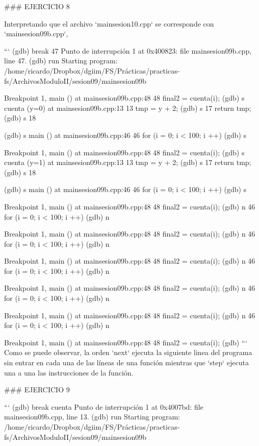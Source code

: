 {{{### EJERCICIO 8

Interpretando que el archivo `mainsesion10.cpp` se corresponde con `mainsesion09b.cpp`,

```
(gdb) break 47
Punto de interrupción 1 at 0x400823: file mainsesion09b.cpp, line 47.
(gdb) run
Starting program: /home/ricardo/Dropbox/dgiim/FS/Prácticas/practicas-fs/ArchivosModuloII/sesion09/mainsesion09b 

Breakpoint 1, main () at mainsesion09b.cpp:48
48	      final2 = cuenta(i);
(gdb) s
cuenta (y=0) at mainsesion09b.cpp:13
13	   tmp = y + 2; 
(gdb) s
17	   return tmp;
(gdb) s
18	}
(gdb) s
main () at mainsesion09b.cpp:46
46	   for (i = 0; i < 100; i ++)
(gdb) s

Breakpoint 1, main () at mainsesion09b.cpp:48
48	      final2 = cuenta(i);
(gdb) s
cuenta (y=1) at mainsesion09b.cpp:13
13	   tmp = y + 2; 
(gdb) s
17	   return tmp;
(gdb) s
18	}
(gdb) s
main () at mainsesion09b.cpp:46
46	   for (i = 0; i < 100; i ++)
(gdb) s

Breakpoint 1, main () at mainsesion09b.cpp:48
48	      final2 = cuenta(i);
(gdb) n
46	   for (i = 0; i < 100; i ++)
(gdb) n

Breakpoint 1, main () at mainsesion09b.cpp:48
48	      final2 = cuenta(i);
(gdb) n
46	   for (i = 0; i < 100; i ++)
(gdb) n

Breakpoint 1, main () at mainsesion09b.cpp:48
48	      final2 = cuenta(i);
(gdb) n
46	   for (i = 0; i < 100; i ++)
(gdb) n

Breakpoint 1, main () at mainsesion09b.cpp:48
48	      final2 = cuenta(i);
(gdb) n
46	   for (i = 0; i < 100; i ++)
(gdb) n

Breakpoint 1, main () at mainsesion09b.cpp:48
48	      final2 = cuenta(i);
(gdb) n
46	   for (i = 0; i < 100; i ++)
(gdb) n

Breakpoint 1, main () at mainsesion09b.cpp:48
48	      final2 = cuenta(i);
(gdb) 
```
Como se puede observar, la orden `next` ejecuta la siguiente linea del programa sin entrar en cada una de las líneas de una función mientras que `step` ejecuta una a una las instrucciones de la función.

### EJERCICIO 9

```
(gdb) break cuenta
Punto de interrupción 1 at 0x4007bd: file mainsesion09b.cpp, line 13.
(gdb) run
Starting program: /home/ricardo/Dropbox/dgiim/FS/Prácticas/practicas-fs/ArchivosModuloII/sesion09/mainsesion09b 

}

